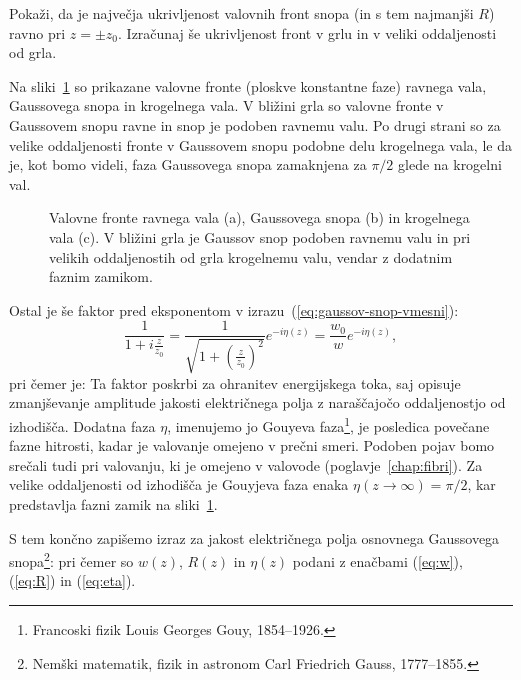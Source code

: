 \begin{naloga}
\label{naloga-ukrivljenost-snopa}
Pokaži, da je največja ukrivljenost valovnih front snopa (in s tem najmanjši $R$) ravno pri $z=\pm z_{0}$.
Izračunaj še ukrivljenost front v grlu in v veliki oddaljenosti od grla.
\end{naloga}

Na sliki~\ref{fig:ravni-Gaussov-krogelni-val} so prikazane 
valovne fronte (ploskve konstantne faze)
ravnega vala, Gaussovega snopa 
in krogelnega vala. V bližini grla so valovne fronte v Gaussovem snopu ravne in snop je 
podoben ravnemu valu. Po drugi strani so za velike oddaljenosti fronte v Gaussovem snopu 
podobne delu krogelnega vala, le da je, kot bomo videli, faza Gaussovega snopa 
zamaknjena za $\pi/2$ glede na krogelni val. 

\begin{figure}[ht]
\centering
\def\svgwidth{76truemm} 

\caption{Valovne fronte ravnega vala (a), Gaussovega snopa (b) in
krogelnega vala (c). V bližini grla je Gaussov snop podoben ravnemu valu in 
pri velikih oddaljenostih od grla krogelnemu valu, vendar z dodatnim faznim zamikom.}
\label{fig:ravni-Gaussov-krogelni-val}
\end{figure}

Ostal je  še faktor pred eksponentom v izrazu~(\ref{eq:gaussov-snop-vmesni}):
\begin{equation}
\frac{1}{1+i\frac{z}{z_{0}}}=\frac{1}{\sqrt{1+(\frac{z}{z_0})^{2}}}e^{-i\eta(z)}=\frac{w_{0}}{w}e^{-i\eta(z)},
\end{equation}
 pri čemer je:
Ta faktor poskrbi za ohranitev energijskega toka, saj opisuje zmanjševanje amplitude
jakosti električnega polja z naraščajočo oddaljenostjo od izhodišča.  
Dodatna faza $\eta$, imenujemo jo Gouyeva 
faza\footnote{Francoski fizik Louis Georges Gouy, 1854--1926.},
je posledica povečane fazne hitrosti, 
kadar je valovanje omejeno v prečni smeri. Podoben pojav bomo srečali tudi pri valovanju, ki je 
omejeno v valovode (poglavje~\ref{chap:fibri}). Za velike oddaljenosti od izhodišča je Gouyjeva faza enaka $\eta (z\to\infty) = \pi/2$,
kar predstavlja fazni zamik na sliki~\ref{fig:ravni-Gaussov-krogelni-val}.

S tem končno zapišemo izraz za jakost električnega polja osnovnega Gaussovega 
snopa\footnote{Nemški matematik, fizik in astronom Carl Friedrich Gauss, 1777--1855.}:
pri čemer so $w(z)$, $R(z)$ in $\eta(z)$ podani z enačbami (\ref{eq:w}), (\ref{eq:R}) in (\ref{eq:eta}).

